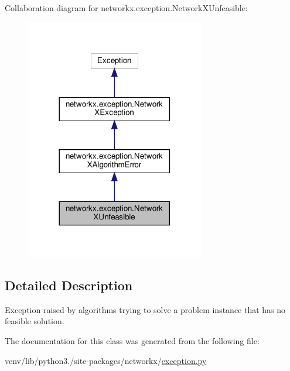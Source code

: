 Collaboration diagram for networkx.\+exception.\+Network\+X\+Unfeasible\+:
\nopagebreak
\begin{figure}[H]
\begin{center}
\leavevmode
\includegraphics[width=221pt]{classnetworkx_1_1exception_1_1NetworkXUnfeasible__coll__graph}
\end{center}
\end{figure}


\subsection{Detailed Description}
\begin{DoxyVerb}Exception raised by algorithms trying to solve a problem
instance that has no feasible solution.\end{DoxyVerb}
 

The documentation for this class was generated from the following file\+:\begin{DoxyCompactItemize}
\item 
venv/lib/python3./site-\/packages/networkx/\hyperlink{exception_8py}{exception.\+py}\end{DoxyCompactItemize}
